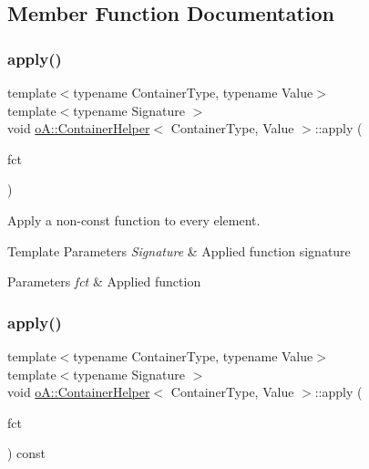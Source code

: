 \subsection{Member Function Documentation}
\mbox{\label{classo_a_1_1_container_helper_ab0a8a0bce2178cf1ded50b3d4202aa39}} 
\subsubsection{\texorpdfstring{apply()}{apply()}\hspace{0.1cm}{\footnotesize\ttfamily [1/2]}}
{\footnotesize\ttfamily template$<$typename Container\+Type, typename Value$>$ \\
template$<$typename Signature $>$ \\
void \mbox{\hyperlink{classo_a_1_1_container_helper}{o\+A\+::\+Container\+Helper}}$<$ Container\+Type, Value $>$\+::apply (\begin{DoxyParamCaption}\item[{const Signature \&}]{fct }\end{DoxyParamCaption})\hspace{0.3cm}{\ttfamily [inline]}}



Apply a non-\/const function to every element. 


\begin{DoxyTemplParams}{Template Parameters}
{\em Signature} & Applied function signature \\
\hline
\end{DoxyTemplParams}

\begin{DoxyParams}{Parameters}
{\em fct} & Applied function \\
\hline
\end{DoxyParams}
\mbox{\label{classo_a_1_1_container_helper_a659bf470905acc97ae8badf9e985190b}} 
\subsubsection{\texorpdfstring{apply()}{apply()}\hspace{0.1cm}{\footnotesize\ttfamily [2/2]}}
{\footnotesize\ttfamily template$<$typename Container\+Type, typename Value$>$ \\
template$<$typename Signature $>$ \\
void \mbox{\hyperlink{classo_a_1_1_container_helper}{o\+A\+::\+Container\+Helper}}$<$ Container\+Type, Value $>$\+::apply (\begin{DoxyParamCaption}\item[{const Signature \&}]{fct }\end{DoxyParamCaption}) const\hspace{0.3cm}{\ttfamily [inline]}}



